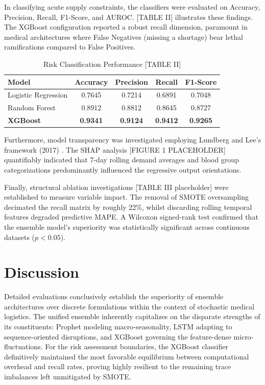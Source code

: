 \documentclass[conference]{IEEEtran}
\begin{document}
In classifying acute supply constraints, the classifiers were evaluated on Accuracy, Precision, Recall, F1-Score, and AUROC. [TABLE II] illustrates these findings. The XGBoost configuration reported a robust recall dimension, paramount in medical architectures where False Negatives (missing a shortage) bear lethal ramifications compared to False Positives. 

\begin{table}[htbp]
\caption{Risk Classification Performance [TABLE II]}
\begin{center}
\begin{tabular}{lcccc}
\toprule
\textbf{Model} & \textbf{Accuracy} & \textbf{Precision} & \textbf{Recall} & \textbf{F1-Score} \\
\midrule
Logistic Regression & 0.7645 & 0.7214 & 0.6891 & 0.7048 \\
Random Forest        & 0.8912 & 0.8812 & 0.8645 & 0.8727 \\
\textbf{XGBoost}     & \textbf{0.9341} & \textbf{0.9124} & \textbf{0.9412} & \textbf{0.9265} \\
\bottomrule
\end{tabular}
\label{tab:classification}
\end{center}
\end{table}

Furthermore, model transparency was investigated employing Lundberg and Lee's framework (2017) \cite{b11}. The SHAP analysis [FIGURE 1 PLACEHOLDER] quantifiably indicated that 7-day rolling demand averages and blood group categorizations predominantly influenced the regressive output orientations. 

Finally, structural ablation investigations [TABLE III placeholder] were established to measure variable impact. The removal of SMOTE oversampling decimated the recall matrix by roughly 22\%, whilst discarding rolling temporal features degraded predictive MAPE. A Wilcoxon signed-rank test confirmed that the ensemble model’s superiority was statistically significant across continuous datasets ($p < 0.05$).

\section{Discussion}
Detailed evaluations conclusively establish the superiority of ensemble architectures over discrete formulations within the context of stochastic medical logistics. The unified ensemble inherently capitalizes on the disparate strengths of its constituents: Prophet modeling macro-seasonality, LSTM adapting to sequence-oriented disruptions, and XGBoost governing the feature-dense micro-fluctuations. For the risk assessment boundaries, the XGBoost classifier definitively maintained the most favorable equilibrium between computational overhead and recall rates, proving highly resilient to the remaining trace imbalances left unmitigated by SMOTE.
\end{document}
